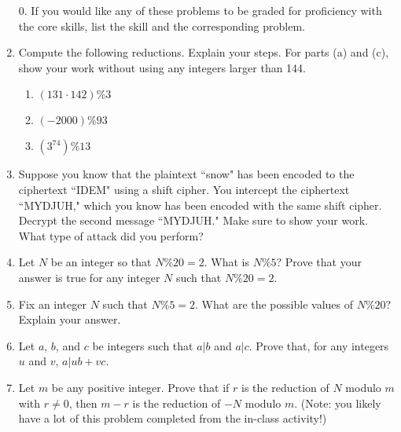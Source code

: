 \documentclass[12pt]{article}
\begin{document}
\begin{enumerate}
\item[0.] If you would like any of these problems to be graded for proficiency with the core skills, list the skill and the corresponding problem.
\item Compute the following reductions.  Explain your steps.  For parts (a) and (c), show your work without using any integers larger than 144. 
\begin{multicols}{3}
\begin{enumerate}

\item $(131\cdot 142) \% 3$ 
\item $(-2000) \% 93$
\item $\left(3^{74}\right) \% 13$ 
\end{enumerate}
\end{multicols}
\item Suppose you know that the plaintext ``snow" has been encoded to the ciphertext ``IDEM" using a shift cipher.  You intercept the ciphertext ``MYDJUH," which you know has been encoded with the same shift cipher.  Decrypt the second message ``MYDJUH." Make sure to show your work.   What type of attack did you perform?
\item Let $N$ be an integer so that $N\%20 = 2$.  What is $N\%5$?  Prove that your answer is true for any integer $N$ such that $N\%20=2$.

\item Fix an integer $N$ such that $N\%5=2$. What are the possible values of $N\%20$? Explain your answer. 

\item Let $a$, $b$, and $c$ be integers such that $a|b$ and $a|c$. Prove that,  for any integers $u$ and $v$, $a|ub+vc$. 

\item Let $m$ be any positive integer. Prove that  if $r$ is the reduction of $N$ modulo $m$ with $r\ne 0$, then $m-r$ is the reduction of $-N$ modulo $m$.  (Note: you likely have a lot of this problem completed from the in-class activity!)
\end{enumerate}
\end{document}
